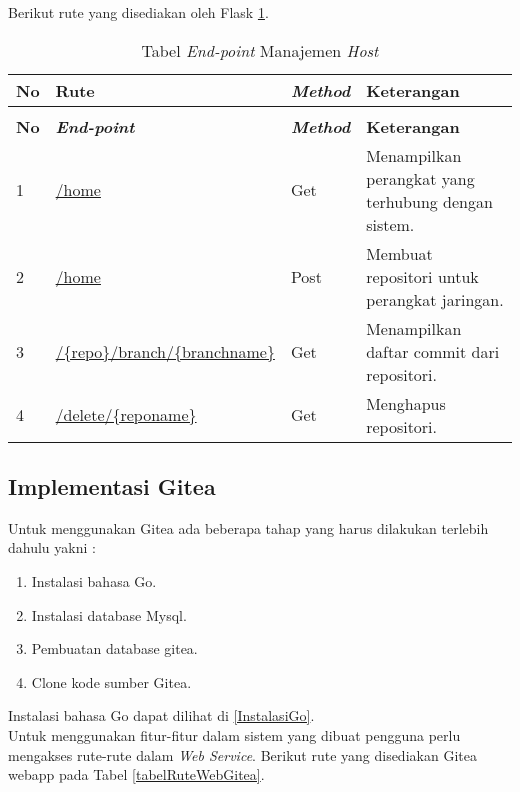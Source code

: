    		Berikut rute yang disediakan oleh Flask \ref{tabelRuteFlaskApi}.
   		\begin{longtable}{|p{}|p{}|p{}|p{}|}
   			
   			\caption{Tabel rute \textit{web service} pada \textit{middleware}} \label{tabelRuteFlaskApi} \\
   			\hline
   			\textbf{No} & \textbf{Rute} & \textbf{\textit{Method}} & \textbf{Keterangan} \\ \hline
   			\endfirsthead
   			\caption[]{Tabel \textit{End-point} Manajemen \textit{Host}}   \\
   			\hline
   			\textbf{No} & \textbf{\textit{End-point}} & \textbf{\textit{Method}} & \textbf{Keterangan} \\ \hline
   			\endhead
   			\endfoot
   			\endlastfoot
   			
   			1 & \url{/home} & Get & Menampilkan perangkat yang terhubung dengan sistem. \\ \hline
   			2 & \url{/home} & Post & Membuat repositori untuk perangkat jaringan. \\ \hline	
   			3 & \url{/{repo}/branch/{branchname}} & Get & Menampilkan daftar commit dari repositori.\\ \hline	
   			4 & \url{/delete/{reponame}} & Get & Menghapus repositori.\\ \hline
   			
   		\end{longtable}
   		
   		\subsection{Implementasi Gitea}
   		
   		Untuk menggunakan Gitea ada beberapa tahap yang harus dilakukan terlebih dahulu yakni :
   			\begin{enumerate}
   				\item Instalasi bahasa Go.
   				\item Instalasi database Mysql.
   				\item Pembuatan database gitea.
   				\item Clone kode sumber Gitea.
   			\end{enumerate}
   		Instalasi bahasa Go dapat dilihat di \ref{InstalasiGo}.\\
   		
   		Untuk menggunakan fitur-fitur dalam sistem yang dibuat pengguna perlu mengakses rute-rute dalam \textit{Web Service}. Berikut rute yang disediakan Gitea webapp pada Tabel \ref{tabelRuteWebGitea}.
   		
